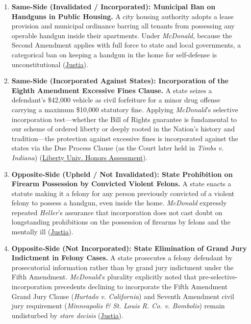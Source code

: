 \documentclass[12pt]{article}
\begin{document}
\begin{enumerate}
\item \textbf{Same-Side (Invalidated / Incorporated): Municipal Ban on Handguns in Public Housing.} A city housing authority adopts a lease provision and municipal ordinance barring all tenants from possessing any operable handgun inside their apartments. Under \textit{McDonald}, because the Second Amendment applies with full force to state and local governments, a categorical ban on keeping a handgun in the home for self-defense is unconstitutional (\href{https://supreme.justia.com/cases/federal/us/561/742/}{Justia}).
\item \textbf{Same-Side (Incorporated Against States): Incorporation of the Eighth Amendment Excessive Fines Clause.} A state seizes a defendant's \$42,000 vehicle as civil forfeiture for a minor drug offense carrying a maximum \$10,000 statutory fine. Applying \textit{McDonald}'s selective incorporation test---whether the Bill of Rights guarantee is fundamental to our scheme of ordered liberty or deeply rooted in the Nation's history and tradition---the protection against excessive fines is incorporated against the states via the Due Process Clause (as the Court later held in \textit{Timbs v. Indiana}) (\href{https://digitalcommons.liberty.edu/cgi/viewcontent.cgi?article=2451&context=honors}{Liberty Univ. Honors Assessment}).
\item \textbf{Opposite-Side (Upheld / Not Invalidated): State Prohibition on Firearm Possession by Convicted Violent Felons.} A state enacts a statute making it a felony for any person previously convicted of a violent felony to possess a handgun, even inside the home. \textit{McDonald} expressly repeated \textit{Heller}'s assurance that incorporation does not cast doubt on longstanding prohibitions on the possession of firearms by felons and the mentally ill (\href{https://supreme.justia.com/cases/federal/us/561/742/}{Justia}).
\item \textbf{Opposite-Side (Not Incorporated): State Elimination of Grand Jury Indictment in Felony Cases.} A state prosecutes a felony defendant by prosecutorial information rather than by grand jury indictment under the Fifth Amendment. \textit{McDonald}'s plurality explicitly noted that pre-selective-incorporation precedents declining to incorporate the Fifth Amendment Grand Jury Clause (\textit{Hurtado v. California}) and Seventh Amendment civil jury requirement (\textit{Minneapolis \& St. Louis R. Co. v. Bombolis}) remain undisturbed by \textit{stare decisis} (\href{https://supreme.justia.com/cases/federal/us/561/742/}{Justia}).

\end{enumerate}
\end{document}
